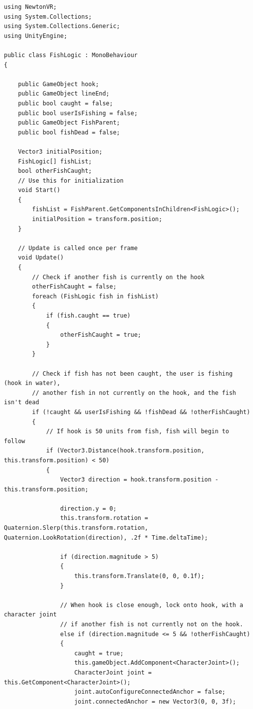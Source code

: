 \documentclass[10pt,journal,compsoc,onecolumn, draftclsnofoot]{IEEEtran}
\begin{document}
\begin{verbatim}
using NewtonVR;
using System.Collections;
using System.Collections.Generic;
using UnityEngine;

public class FishLogic : MonoBehaviour
{

    public GameObject hook;
    public GameObject lineEnd;
    public bool caught = false;
    public bool userIsFishing = false;
    public GameObject FishParent;
    public bool fishDead = false;

    Vector3 initialPosition;
    FishLogic[] fishList;
    bool otherFishCaught;
    // Use this for initialization
    void Start()
    {
        fishList = FishParent.GetComponentsInChildren<FishLogic>();
        initialPosition = transform.position;
    }

    // Update is called once per frame
    void Update()
    {
        // Check if another fish is currently on the hook
        otherFishCaught = false;
        foreach (FishLogic fish in fishList)
        {
            if (fish.caught == true)
            {
                otherFishCaught = true;
            }
        }

        // Check if fish has not been caught, the user is fishing (hook in water),
        // another fish in not currently on the hook, and the fish isn't dead
        if (!caught && userIsFishing && !fishDead && !otherFishCaught)
        {
            // If hook is 50 units from fish, fish will begin to follow
            if (Vector3.Distance(hook.transform.position, this.transform.position) < 50)
            {
                Vector3 direction = hook.transform.position - this.transform.position;

                direction.y = 0;
                this.transform.rotation = Quaternion.Slerp(this.transform.rotation, Quaternion.LookRotation(direction), .2f * Time.deltaTime);

                if (direction.magnitude > 5)
                {
                    this.transform.Translate(0, 0, 0.1f);
                }

                // When hook is close enough, lock onto hook, with a character joint
                // if another fish is not currently not on the hook.
                else if (direction.magnitude <= 5 && !otherFishCaught)
                {
                    caught = true;
                    this.gameObject.AddComponent<CharacterJoint>();
                    CharacterJoint joint = this.GetComponent<CharacterJoint>();
                    joint.autoConfigureConnectedAnchor = false;
                    joint.connectedAnchor = new Vector3(0, 0, 3f);


\end{verbatim}
\end{document}
